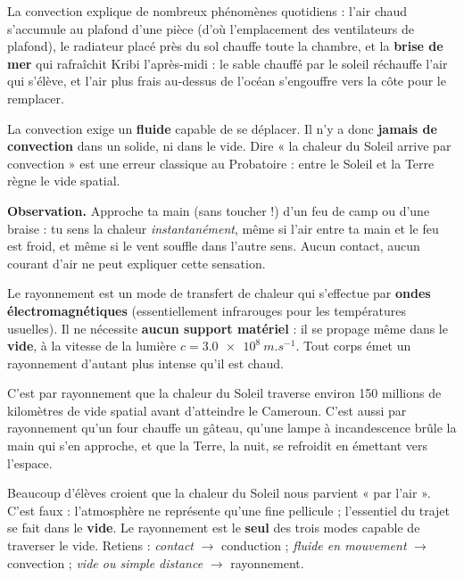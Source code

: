 \documentclass[11pt]{article}
\newcommand{\cle}[1]{{\popxbold\color{popdark}#1}}
\newcounter{popsec}
\newcounter{popsub}
\newcommand{\courssub}[1]{%
  \stepcounter{popsub}%
  \par\vspace{9pt}\noindent{\popxbold\fontsize{11.5}{13}\selectfont\color{popink}{\color{poporange}\thepopsec.\thepopsub}\hspace{6pt}#1}\par\nopagebreak\vspace{4pt}
}
\begin{document}
La convection explique de nombreux phénomènes quotidiens : l'air chaud s'accumule au plafond d'une pièce (d'où l'emplacement des ventilateurs de plafond), le radiateur placé près du sol chauffe toute la chambre, et la \textbf{brise de mer} qui rafraîchit Kribi l'après-midi : le sable chauffé par le soleil réchauffe l'air qui s'élève, et l'air plus frais au-dessus de l'océan s'engouffre vers la côte pour le remplacer.

\begin{attention}
La convection exige un \textbf{fluide} capable de se déplacer. Il n'y a donc \textbf{jamais de convection} dans un solide, ni dans le vide. Dire « la chaleur du Soleil arrive par convection » est une erreur classique au Probatoire : entre le Soleil et la Terre règne le vide spatial.
\end{attention}

\courssub{Le rayonnement thermique}

\textbf{Observation.} Approche ta main (sans toucher !) d'un feu de camp ou d'une braise : tu sens la chaleur \emph{instantanément}, même si l'air entre ta main et le feu est froid, et même si le vent souffle dans l'autre sens. Aucun contact, aucun courant d'air ne peut expliquer cette sensation.

\begin{definition}
Le \cle{rayonnement} est un mode de transfert de chaleur qui s'effectue par \textbf{ondes électromagnétiques} (essentiellement infrarouges pour les températures usuelles). Il ne nécessite \textbf{aucun support matériel} : il se propage même dans le \textbf{vide}, à la vitesse de la lumière $c = \SI{3,0e8}{m.s^{-1}}$. Tout corps émet un rayonnement d'autant plus intense qu'il est chaud.
\end{definition}

C'est par rayonnement que la chaleur du Soleil traverse environ 150 millions de kilomètres de vide spatial avant d'atteindre le Cameroun. C'est aussi par rayonnement qu'un four chauffe un gâteau, qu'une lampe à incandescence brûle la main qui s'en approche, et que la Terre, la nuit, se refroidit en émettant vers l'espace.

\begin{attention}
Beaucoup d'élèves croient que la chaleur du Soleil nous parvient « par l'air ». C'est faux : l'atmosphère ne représente qu'une fine pellicule ; l'essentiel du trajet se fait dans le \textbf{vide}. Le rayonnement est le \textbf{seul} des trois modes capable de traverser le vide. Retiens : \emph{contact} $\rightarrow$ conduction ; \emph{fluide en mouvement} $\rightarrow$ convection ; \emph{vide ou simple distance} $\rightarrow$ rayonnement.
\end{attention}
\end{document}
